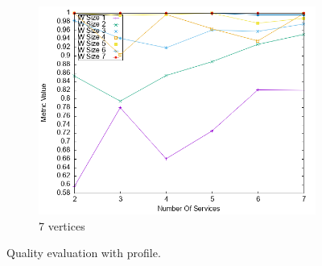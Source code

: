 \begin{figure}[ht]
\begin{subfigure}{0.33\textwidth}
    \includegraphics[width=\textwidth]{Images/graphs/newwindow_quality_performance_diff_perce_n7_s7_20_100_n7}
    \caption{7 vertices}
    \label{fig:quality_window_perce_wide_7n}
  \end{subfigure}
  \caption{ Quality evaluation with \wide profile.}
  \label{fig:quality_window_perce_wide}
\end{figure}


